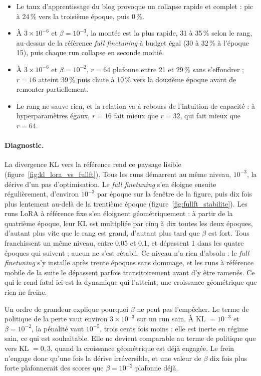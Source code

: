\documentclass[11pt,a4paper]{article}
\begin{document}
\begin{itemize}
    \item Le taux d'apprentissage du blog provoque un collapse rapide et complet : pic à 24\,\% vers la troisième époque, puis 0\,\%.
    \item À $3 \times 10^{-6}$ et $\beta = 10^{-3}$, la montée est la plus rapide, 31 à 35\,\% selon le rang, au-dessus de la référence \emph{full finetuning} à budget égal (30 à 32\,\% à l'époque 15), puis chaque run collapse en seconde moitié.
    \item À $3 \times 10^{-6}$ et $\beta = 10^{-2}$, $r=64$ plafonne entre 21 et 29\,\% sans s'effondrer ; $r=16$ atteint 39\,\% puis chute à 10\,\% vers la douzième époque avant de remonter partiellement.
    \item Le rang ne sauve rien, et la relation va à rebours de l'intuition de capacité : à hyperparamètres égaux, $r=16$ fait mieux que $r=32$, qui fait mieux que $r=64$.
\end{itemize}

\paragraph{Diagnostic.} La divergence KL vers la référence rend ce paysage lisible (figure~\ref{fig:kl_lora_vs_fullft}). Tous les runs démarrent au même niveau, $10^{-3}$, la dérive d'un pas d'optimisation. Le \emph{full finetuning} s'en éloigne ensuite régulièrement, d'environ $10^{-3}$ par époque sur la fenêtre de la figure, puis dix fois plus lentement au-delà de la trentième époque (figure~\ref{fig:fullft_stabilite}). Les runs LoRA à référence fixe s'en éloignent géométriquement : à partir de la quatrième époque, leur KL est multipliée par cinq à dix toutes les deux époques, d'autant plus vite que le rang est grand, d'autant plus tard que $\beta$ est fort. Tous franchissent un même niveau, entre 0{,}05 et 0{,}1, et dépassent 1 dans les quatre époques qui suivent ; aucun ne s'est rétabli. Ce niveau n'a rien d'absolu : le \emph{full finetuning} s'y installe après trente époques sans dommage, et les runs à référence mobile de la suite le dépassent parfois transitoirement avant d'y être ramenés. Ce qui le rend fatal ici est la dynamique qui l'atteint, une croissance géométrique que rien ne freine. 





Un ordre de grandeur explique pourquoi $\beta$ ne peut pas l'empêcher. Le terme de politique de la perte vaut environ $3 \times 10^{-3}$ sur un run sain. À KL $= 10^{-3}$ et $\beta = 10^{-2}$, la pénalité vaut $10^{-5}$, trois cents fois moins : elle est inerte en régime sain, ce qui est souhaitable. Elle ne devient comparable au terme de politique que vers KL $= 0{,}3$, quand la croissance géométrique est déjà engagée. Le frein n'engage donc qu'une fois la dérive irréversible, et une valeur de $\beta$ dix fois plus forte plafonnerait des scores que $\beta = 10^{-2}$ plafonne déjà.
\end{document}
